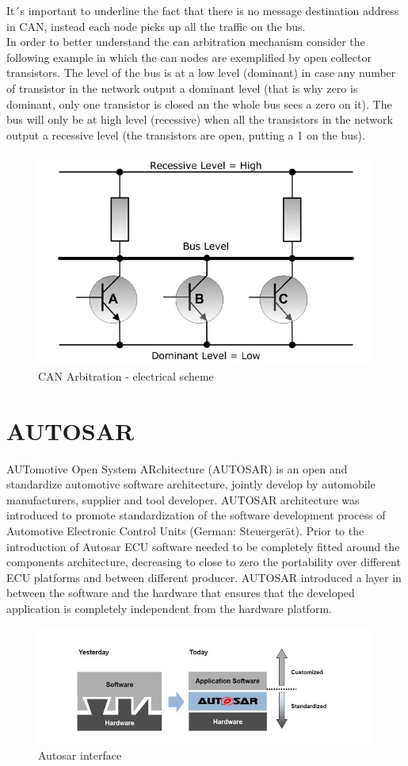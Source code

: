 \documentclass[../main.tex]{subfiles}
\begin{document}
It´s important to underline the fact that there is no message destination address in CAN, instead each node picks up all the traffic on the bus.\\
In order to better understand the can arbitration mechanism consider the following example in which the can nodes are exemplified by open collector transistors. 
The level of the bus is at a low level (dominant) in case any number of transistor in the network output a dominant level (that is why zero is dominant, only one transistor is closed an the whole bus sees a zero on it). The bus will only be at high level (recessive) when all the transistors in the network output a recessive level (the transistors are open, putting a 1 on the bus).
\begin{figure}[ht]
    \centering
    \includegraphics[width=0.7\linewidth]{images_folder/controller-area-network-can-bus-bus-arbitration-3.jpg}
    \caption{CAN Arbitration -  electrical scheme}
    \label{fig:CANABRELT}
\end{figure}
\section{AUTOSAR}
AUTomotive Open System ARchitecture (AUTOSAR) is an open and standardize automotive software architecture, jointly develop by automobile manufacturers, supplier and tool developer. AUTOSAR architecture was introduced to promote standardization of the software development process of Automotive Electronic Control Units (German: Steuergerät). Prior to the introduction of Autosar ECU software needed to be completely fitted around the components architecture, decreasing to close to zero the portability over different ECU platforms and between different producer. 
AUTOSAR introduced a layer in between the software and the hardware that ensures that the developed application is completely independent from the hardware platform. 
\begin{figure}[h]
    \centering
    \includegraphics[width=\linewidth]{images_folder/autosarcapture.jpg}
    \caption{Autosar interface}
    \label{fig:AUTCA}
\end{figure}
\end{document}
